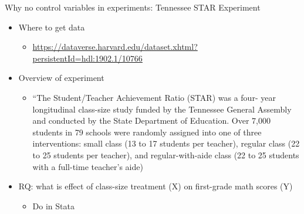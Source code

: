 \begin{frame}{Why no control variables in experiments: Tennessee STAR Experiment}
	\begin{itemize}
	\item Where to get data
		\begin{itemize}
		\item \url{https://dataverse.harvard.edu/dataset.xhtml?persistentId=hdl:1902.1/10766} 
		\end{itemize}
	\item Overview of experiment
		\begin{itemize}
		\item ``The Student/Teacher Achievement Ratio (STAR) was a four- year longitudinal class-size study funded by the Tennessee General Assembly and conducted by the State Department of Education. Over 7,000 students in 79 schools were randomly assigned into one of three interventions: small class (13 to 17 students per teacher), regular class (22 to 25 students per teacher), and regular-with-aide class (22 to 25 students with a full-time teacher's aide)
		\vspace{2mm}
		\end{itemize}
	\item RQ: what is effect of class-size treatment (X) on first-grade math scores (Y)
		\begin{itemize}
		\item Do in Stata
		\end{itemize}
	
	\end{itemize}
\end{frame}


